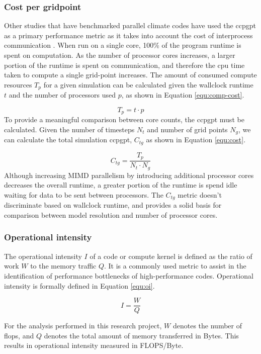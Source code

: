 \documentclass[a4paper,11pt]{report}
\begin{document}
\subsubsection{Cost per gridpoint}
Other studies that have benchmarked parallel climate codes have used the \gls{ccpgpt} as a primary performance metric as it takes into account the cost of interprocess communication \cite{schmidt2007benchmark}. When run on a single core, 100\% of the program runtime is spent on computation. As the number of processor cores increases, a larger portion of the runtime is spent on communication, and therefore the cpu time taken to compute a single grid-point increases. The amount of consumed compute resources $T_p$ for a given simulation can be calculated given the wallclock runtime $t$ and the number of processors used $p$, as shown in Equation \ref{equ:comp-cost}.
\par
\begin{equation}
T_p = t \cdot p
\label{equ:comp-cost}
\end{equation}
To provide a meaningful comparison between core counts, the \gls{ccpgpt} must be calculated. Given the number of timesteps $N_t$ and number of grid points $N_g$, we can calculate the total simulation \gls{ccpgpt}, $C_{tg}$ as shown in Equation \ref{equ:cost}. 

\begin{equation}
C_{tg} = \frac{T_p}{N_t \cdot N_g}
\label{equ:cost}
\end{equation}
Although increasing MIMD parallelism by introducing additional processor cores decreases the overall runtime, a greater portion of the runtime is spend idle waiting for data to be sent between processors. The $C_{tg}$ metric doesn't discriminate based on wallclock runtime, and provides a solid basis for comparison between model resolution and number of processor cores. 

\subsubsection{Operational intensity}
The operational intensity $I$ of a code or compute kernel is defined as the ratio of work $W$ to the memory traffic $Q$. It is a commonly used metric to assist in the identification of performance bottlenecks of high-performance codes. Operational intensity is formally defined in Equation \ref{equ:oi}.

\begin{equation}
\label{equ:oi}
I = \frac{W}{Q}
\end{equation}
\par
For the analysis performed in this research project, $W$ denotes the number of \gls{flops}, and $Q$ denotes the total amount of memory transferred in Bytes. This results in operational intensity measured in FLOPS/Byte. 
\end{document}
